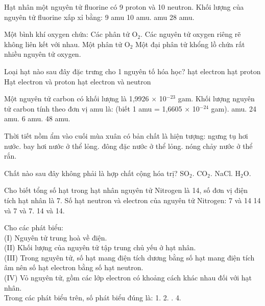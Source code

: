\documentclass[11pt,a4paper]{article}
\begin{document}
\begin{ex}
Hạt nhân một nguyên tử fluorine có 9 proton và 10 neutron. Khối lượng của nguyên tử fluorine xấp xỉ bằng:
\choice
{9 amu}
{10 amu.}
{ amu}
{28 amu.}
\end{ex}

\begin{ex}
Một bình khí oxygen chứa:
\choice
{\True Các phân tử O$_{2}$.}
{Các nguyên tử oxygen riêng rẽ không liên kết với nhau.}
{Một phân tử O$_{2}$}
{Một đại phân tử khổng lồ chứa rất nhiều nguyên tử oxygen.}
\end{ex}

\begin{ex}
Loại hạt nào sau đây đặc trưng cho 1 nguyên tố hóa học?
\choice
{hạt electron}
{\True hạt proton}
{Hạt electron và proton}
{hạt electron và neutron}
\end{ex}

\begin{ex}
Một nguyên tử carbon có khối lượng là 1,9926 $\times$  10$^{-23}$ gam. Khối lượng nguyên tử carbon tính theo đơn vị amu là: (biết 1 amu = 1,6605 $\times$  10$^{-24}$ gam).
\choice
{ amu.}
{24 amu.}
{6 amu.}
{48 amu.}
\end{ex}

\begin{ex}
Thời tiết nồm ẩm vào cuối mùa xuân có bản chất là hiện tượng:
\choice
{\True ngưng tụ hơi nước.}
{bay hơi nước ở thể lỏng.}
{đông đặc nước ở thể lỏng.}
{nóng chảy nước ở thể rắn.}
\end{ex}

\begin{ex}
Chất nào sau đây không phải là hợp chất cộng hóa trị?
\choice
{SO$_{2}$.}
{CO$_{2}$.}
{\True NaCl.}
{H$_{2}$O.}
\end{ex}

\begin{ex}
Cho biết tổng số hạt trong hạt nhân nguyên tử Nitrogen là 14, số đơn vị điện tích hạt nhân là 7. Số hạt neutron và electron của nguyên tử Nitrogen:
\choice
{7 và 14}
{14 và 7}
{ và 7.}
{14 và 14.}
\end{ex}

\begin{ex}
Cho các phát biểu:\\ (I) Nguyên tử trung hoà về điện.\\ (II) Khối lượng của nguyên tử tập trung chủ yếu ở hạt nhân.\\ (III) Trong nguyên tử, số hạt mang điện tích dương bằng số hạt mang điện tích âm nên số hạt electron bằng số hạt neutron.\\ (IV) Vỏ nguyên tử, gồm các lớp electron có khoảng cách khác nhau đối với hạt nhân.\\ Trong các phát biểu trên, số phát biểu đúng là:
\choice
{1.}
{2.}
{.}
{4.}
\end{ex}
\end{document}
